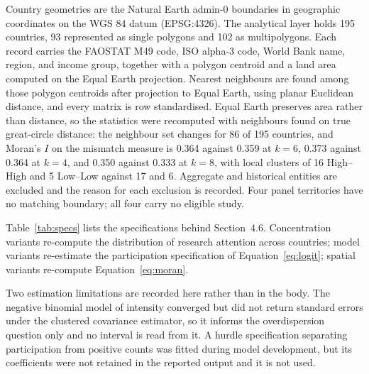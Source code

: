 \documentclass[ASNA,twocolumn]{USG}
\makeatletter
\newcommand{\applabel}[2]{\phantomsection\edef\@currentlabel{#1}\label{#2}}
\makeatother
\begin{document}

Country geometries are the Natural Earth admin-0 boundaries in geographic coordinates on the
WGS 84 datum (EPSG:4326). The analytical layer holds 195 countries, 93 represented as single
polygons and 102 as multipolygons. Each record carries the FAOSTAT M49 code, ISO alpha-3 code, World Bank name, region, and income
group, together with a polygon centroid and a land area computed on the Equal Earth projection.
Nearest neighbours are found among those polygon centroids after projection to Equal Earth, using
planar Euclidean distance, and every matrix is row standardised. Equal Earth preserves area
rather than distance, so the statistics were recomputed with neighbours found on true
great-circle distance: the neighbour set changes for 86 of 195 countries, and Moran's $I$ on the
mismatch measure is 0.364 against 0.359 at $k=6$, 0.373 against 0.364 at $k=4$, and 0.350 against
0.333 at $k=8$, with local clusters of 16 High--High and 5 Low--Low against 17 and 6. Aggregate and historical entities are excluded
and the reason for each exclusion is recorded. Four panel territories have no matching
boundary; all four carry no eligible study.



\applabel{Appendix D}{app:robust}

Table~\ref{tab:specs} lists the specifications behind Section~4.6. Concentration variants
re-compute the distribution of research attention across countries; model variants re-estimate
the participation specification of Equation~\eqref{eq:logit}; spatial variants re-compute
Equation~\eqref{eq:moran}.

Two estimation limitations are recorded here rather than in the body. The negative binomial
model of intensity converged but did not return standard errors under the clustered covariance
estimator, so it informs the overdispersion question only and no interval is read from it. A
hurdle specification separating participation from positive counts was fitted during model
development, but its coefficients were not retained in the reported output and it is not used.
\end{document}

